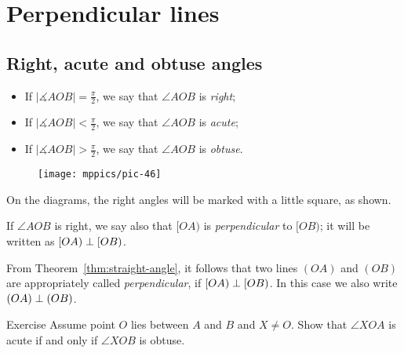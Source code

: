 \chapter{Perpendicular lines}\label{chap:perp}

\section*{Right, acute and obtuse angles}

\begin{itemize}
\item If $|\measuredangle A O B|=\tfrac\pi2$, we say that $\angle A O B$ is \emph{right};
\item If $|\measuredangle A O B|<\tfrac\pi2$, we say that $\angle A O B$ is 
\emph{acute};
\item If $|\measuredangle A O B|>\tfrac\pi2$, we say that $\angle A O B$ is \emph{obtuse}.
\end{itemize}

\begin{wrapfigure}[2]{r}{25mm}
\vskip-25mm
\centering
\texttt{[image: mppics/pic-46]}
\end{wrapfigure}

On the diagrams,
the right angles will be marked with a little square, 
as shown.

If $\angle A O B$ is right,
we say also
that $[O A)$ is \emph{perpendicular} to $[O B)$; 
it will be written as $[O A)\z\perp [O B)$.

From Theorem~\ref{thm:straight-angle}, 
it follows that two lines $(O A)$
 and $(O B)$ are appropriately called {}\emph{perpendicular}, if $[O A)\z\perp [O B)$.
In this case we also write $(O A)\z\perp (O B)$.



\begin{thm}{Exercise}\label{ex:acute-obtuce}
Assume point $O$ lies between $A$ and $B$ and $X\ne O$.
Show that 
$\angle XOA$ is acute if and only if 
$\angle XOB$ is obtuse.
\end{thm}



